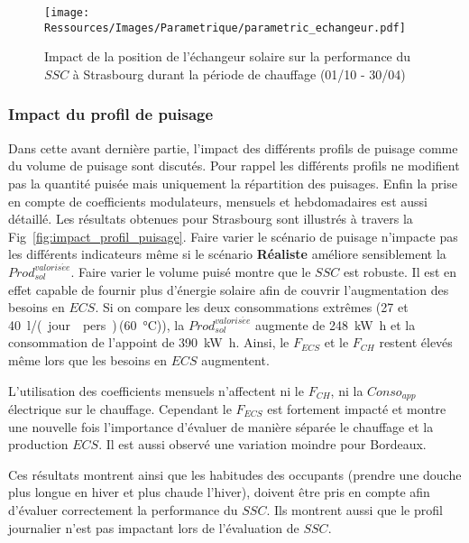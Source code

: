 \begin{figure}
    \begin{center}
        \texttt{[image: Ressources/Images/Parametrique/parametric\_echangeur.pdf]}
    \end{center}
    \caption{Impact de la position de l’échangeur solaire sur la performance
             du $SSC$ à Strasbourg durant la période de chauffage (01/10 - 30/04)
             \label{fig:impact_pos_ech}}
\end{figure}


\subsubsection{Impact du profil de puisage} %
\label{ssub:impact_du_profil_de_puisage}
Dans cette avant dernière partie, l’impact des différents profils de puisage comme
du volume de puisage sont discutés. Pour rappel
les différents profils ne modifient pas la quantité puisée mais uniquement la répartition
des puisages. Enfin la prise en compte de coefficients modulateurs, mensuels et hebdomadaires
est aussi détaillé.
Les résultats obtenues pour Strasbourg sont illustrés à travers la Fig~\ref{fig:impact_profil_puisage}.
Faire varier le scénario de puisage n’impacte pas les différents indicateurs
même si le scénario \textbf{Réaliste} améliore sensiblement la  $Prod_{sol}^{valoris\acute ee}$.
Faire varier le volume puisé montre que le $SSC$ est robuste. Il est en effet capable de
fournir plus d’énergie solaire afin de couvrir l’augmentation des besoins en $ECS$. Si
on compare les deux consommations extrêmes (\num{27} et \SI{40}{\litre/(jour\period pers)}\,(\SI{60}{\celsius})),
la $Prod_{sol}^{valoris\acute ee}$ augmente de \SI{248}{\kilo\watt\hour} et la consommation
de l’appoint de \SI{390}{\kilo\watt\hour}. Ainsi, le $F_{ECS}$ et le $F_{CH}$
restent élevés même lors que les besoins en $ECS$ augmentent.

L’utilisation des coefficients mensuels n’affectent ni le $F_{CH}$, ni la $Conso_{app}$ électrique sur le chauffage.
Cependant le $F_{ECS}$ est fortement impacté et montre une nouvelle fois l’importance
d’évaluer de manière séparée le chauffage et la production $ECS$. Il est aussi observé
une variation moindre pour Bordeaux.

Ces résultats montrent ainsi que les habitudes des occupants (prendre une douche
plus longue en hiver et plus chaude l’hiver), doivent être pris en compte afin d’évaluer correctement la
performance du $SSC$. Ils montrent aussi que le profil journalier n’est pas impactant
lors de l’évaluation de $SSC$.

